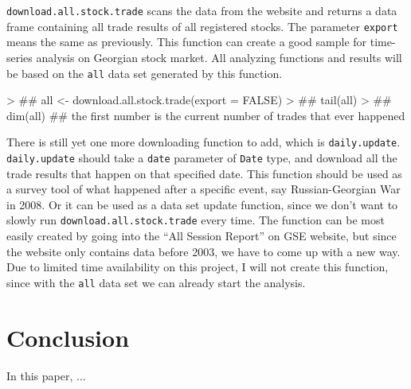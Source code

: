 \documentclass[a4paper]{article}
\begin{document}
\texttt{download.all.stock.trade} scans the data from the website and returns a data frame containing all trade results of all registered stocks. The parameter \texttt{export} means the same as previously. This function can create a good sample for time-series analysis on Georgian stock market. All analyzing functions and results will be based on the \texttt{all} data set generated by this function.

\begin{Schunk}
\begin{Sinput}
> ## all <- download.all.stock.trade(export = FALSE)
> ## tail(all)
> ## dim(all) ## the first number is the current number of trades that ever happened
\end{Sinput}
\end{Schunk}

There is still yet one more downloading function to add, which is \texttt{daily.update}. \texttt{daily.update} should take a \texttt{date} parameter of \texttt{Date} type, and download all the trade results that happen on that specified date. This function should be used as a survey tool of what happened after a specific event, say Russian-Georgian War in 2008. Or it can be used as a data set update function, since we don't want to slowly run \texttt{download.all.stock.trade} every time. The function can be most easily created by going into the ``All Session Report'' on GSE website, but since the website only contains data before 2003, we have to come up with a new way. Due to limited time availability on this project, I will not create this function, since with the \texttt{all} data set we can already start the analysis.

\section{Conclusion}

In this paper, ...
\end{document}
